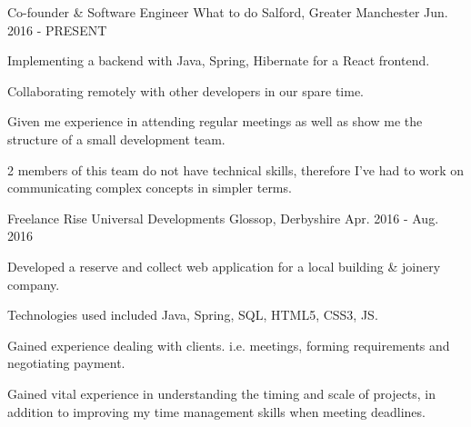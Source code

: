 

\begin{cventries}

  \cventry
    {Co-founder \& Software Engineer} %
    {What to do} %
    {Salford, Greater Manchester} %
    {Jun. 2016 - PRESENT} %
    {
        \begin{cvitems} %
            \item {Implementing a backend with Java, Spring, Hibernate for a React frontend.}
            \item {Collaborating remotely with other developers in our spare time.}
            \item {Given me experience in attending regular meetings as well as show me the structure of a small development team.}
            \item {2 members of this team do not have technical skills, therefore I've had to work on communicating complex concepts in simpler terms.}
        \end{cvitems}
    }

  \cventry
    {Freelance} %
    {Rise Universal Developments} %
    {Glossop, Derbyshire} %
    {Apr. 2016 - Aug. 2016} %
    {
        \begin{cvitems} %
            \item {Developed a reserve and collect web application for a local building \& joinery company.}
            \item {Technologies used included Java, Spring, SQL, HTML5, CSS3, JS.}
            \item {Gained experience dealing with clients. i.e. meetings, forming requirements and negotiating payment.}
            \item {Gained vital experience in understanding the timing and scale of projects, in addition to improving my time management skills when meeting deadlines.}
        \end{cvitems}
    }

\end{cventries}
